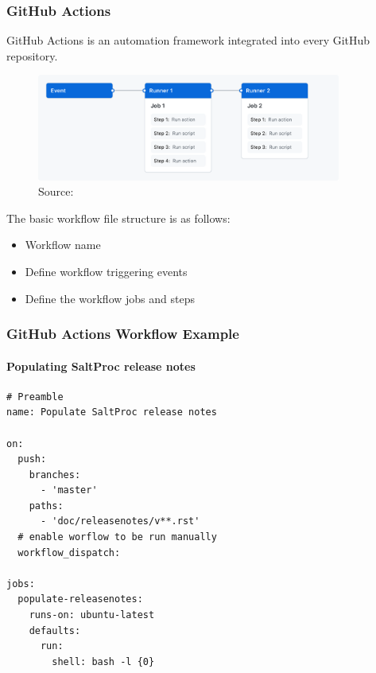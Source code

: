 \begin{frame}
    \frametitle{GitHub Actions}
    
    GitHub Actions is an automation framework integrated into every GitHub repository.

    \begin{figure}[htpb]
        \centering
        \includegraphics[width=10cm]{images/overview-actions-simple}
        \newline
        {\tiny Source: \cite{github_actions_conceptual_example}}
    \end{figure}

    The basic workflow file structure is as follows:
    \begin{itemize}
        \item Workflow name
        \item Define workflow triggering events
        \item Define the workflow jobs and steps
    \end{itemize}

\end{frame}

\begin{frame}[fragile]
    \frametitle{GitHub Actions Workflow Example}
    \framesubtitle{Populating SaltProc release notes}

    \begin{verbatim}
# Preamble
name: Populate SaltProc release notes

on:
  push:
    branches:
      - 'master'
    paths:
      - 'doc/releasenotes/v**.rst'
  # enable worflow to be run manually
  workflow_dispatch:

jobs:
  populate-releasenotes:
    runs-on: ubuntu-latest
    defaults:
      run:
        shell: bash -l {0}
    \end{verbatim}
    
    


\end{frame}

